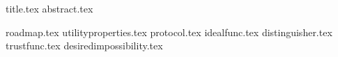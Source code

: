 \documentclass[11pt]{llncs}
\begin{document}
{title.tex}
\thispagestyle{plain}
{abstract.tex}

{roadmap.tex}
{utilityproperties.tex}
{protocol.tex}
{idealfunc.tex}
{distinguisher.tex}
{trustfunc.tex}
{desiredimpossibility.tex}

\end{document}
